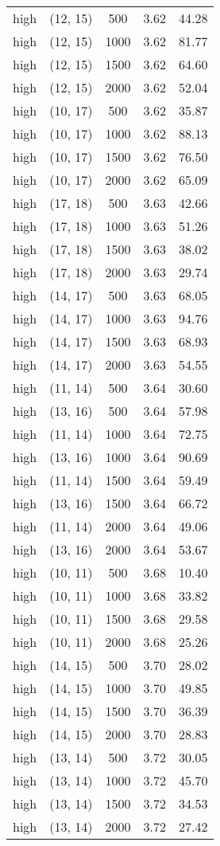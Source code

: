 \begin{tabular}{c c c c c}
high & (12, 15) &  500 & 3.62 & 44.28 \\
high & (12, 15) &  1000 & 3.62 & 81.77 \\
high & (12, 15) &  1500 & 3.62 & 64.60 \\
high & (12, 15) &  2000 & 3.62 & 52.04 \\
high & (10, 17) &  500 & 3.62 & 35.87 \\
high & (10, 17) &  1000 & 3.62 & 88.13 \\
high & (10, 17) &  1500 & 3.62 & 76.50 \\
high & (10, 17) &  2000 & 3.62 & 65.09 \\
high & (17, 18) &  500 & 3.63 & 42.66 \\
high & (17, 18) &  1000 & 3.63 & 51.26 \\
high & (17, 18) &  1500 & 3.63 & 38.02 \\
high & (17, 18) &  2000 & 3.63 & 29.74 \\
high & (14, 17) &  500 & 3.63 & 68.05 \\
high & (14, 17) &  1000 & 3.63 & 94.76 \\
high & (14, 17) &  1500 & 3.63 & 68.93 \\
high & (14, 17) &  2000 & 3.63 & 54.55 \\
high & (11, 14) &  500 & 3.64 & 30.60 \\
high & (13, 16) &  500 & 3.64 & 57.98 \\
high & (11, 14) &  1000 & 3.64 & 72.75 \\
high & (13, 16) &  1000 & 3.64 & 90.69 \\
high & (11, 14) &  1500 & 3.64 & 59.49 \\
high & (13, 16) &  1500 & 3.64 & 66.72 \\
high & (11, 14) &  2000 & 3.64 & 49.06 \\
high & (13, 16) &  2000 & 3.64 & 53.67 \\
high & (10, 11) &  500 & 3.68 & 10.40 \\
high & (10, 11) &  1000 & 3.68 & 33.82 \\
high & (10, 11) &  1500 & 3.68 & 29.58 \\
high & (10, 11) &  2000 & 3.68 & 25.26 \\
high & (14, 15) &  500 & 3.70 & 28.02 \\
high & (14, 15) &  1000 & 3.70 & 49.85 \\
high & (14, 15) &  1500 & 3.70 & 36.39 \\
high & (14, 15) &  2000 & 3.70 & 28.83 \\
high & (13, 14) &  500 & 3.72 & 30.05 \\
high & (13, 14) &  1000 & 3.72 & 45.70 \\
high & (13, 14) &  1500 & 3.72 & 34.53 \\
high & (13, 14) &  2000 & 3.72 & 27.42 \\
\hline
\end{tabular}
